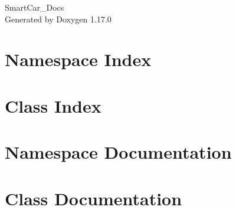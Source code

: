 \documentclass[twoside]{book}
\newcommand{\+}{\discretionary{\mbox{\scriptsize$\hookleftarrow$}}{}{}}
\newcommand{\clearemptydoublepage}{%
    \newpage{\pagestyle{empty}\cleardoublepage}%
  }
\begin{document}
  \raggedbottom
    \hypersetup{pageanchor=false,
                bookmarksnumbered=true,
                pdfencoding=unicode
               }
  \begin{titlepage}
  \vspace*{7cm}
  \begin{center}%
  {\Large Smart\+Car\+\_\+\+Docs}\\
  \vspace*{1cm}
  {\large Generated by Doxygen 1.17.0}\\
  \end{center}
  \end{titlepage}
  \clearemptydoublepage
  \tableofcontents
  \clearemptydoublepage
  \hypersetup{pageanchor=true}
\chapter{Namespace Index}

\chapter{Class Index}

\chapter{Namespace Documentation}



\chapter{Class Documentation}


  \backmatter
  \newpage
  \clearemptydoublepage
  \printindex
\end{document}
